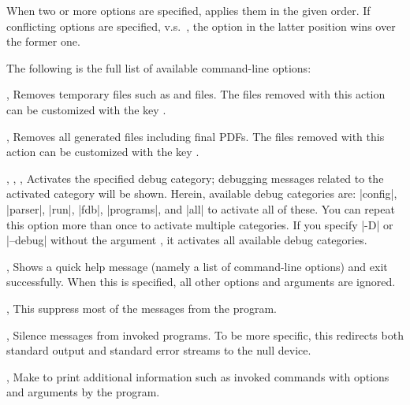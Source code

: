 \documentclass[draft]{llmk-doc}
\begin{document}
When two or more options are specified,  applies them in the given
order. If conflicting options are specified, \eg {} v.s.\ , the
option in the latter position wins over the former one.

The following is the full list of available command-line options:

\begin{clopt}{, }
Removes temporary files such as  and  files. The files
removed with this action can be customized with the key .
\end{clopt}

\begin{clopt}{, }
Removes all generated files including final PDFs. The files removed with this
action can be customized with the key .
\end{clopt}

\begin{clopt}{%
  , ,
  , }
Activates the specified debug category; debugging messages related to the
activated category will be shown. Herein, available debug categories are:
|config|, |parser|, |run|, |fdb|, |programs|, and |all| to activate all of
these. You can repeat this option more than once to activate multiple
categories. If you specify |-D| or |--debug| without the argument
, it activates all available debug categories.
\end{clopt}

\begin{clopt}{, }
Shows a quick help message (namely a list of command-line options) and exit
successfully. When this is specified, all other options and arguments are
ignored.
\end{clopt}

\begin{clopt}{, }
This suppress most of the messages from the program.
\end{clopt}

\begin{clopt}{, }
Silence messages from invoked programs. To be more specific, this redirects
both standard output and standard error streams to the null device.
\end{clopt}

\begin{clopt}{, }
Make  to print additional information such as invoked commands
with options and arguments by the program.
\end{clopt}
\end{document}

